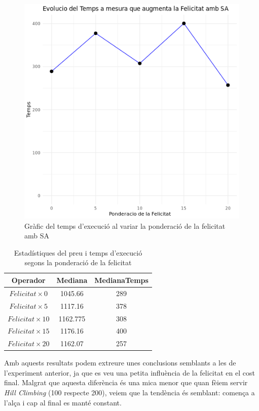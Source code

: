 \documentclass[a4paper]{article}
\begin{document}
\begin{table}[ht]
\begin{figure}[H]
\begin{minipage}{0.45\textwidth}
			\includegraphics[width=\textwidth]{images/exp7b_grafic.png}
			\caption{Gràfic del temps d'execució al variar la ponderació de la felicitat amb SA}
			\label{fig:exp7b_grafic}
		\end{minipage}
	\end{figure}
	
	\begin{table}[H]
		\centering
		\begin{tabular}{|c|c|c|}
			\hline
			\textbf{Operador} & \textbf{Mediana} & \textbf{MedianaTemps} \\
			\hline
			$Felicitat \times 0$ & 1045.66 & 289\\
			\hline
			$Felicitat \times 5$ & 1117.16 & 378\\
			\hline
			$Felicitat \times 10$ & 1162.775 & 308\\
			\hline
			$Felicitat \times 15$ & 1176.16 & 400\\
			\hline
			$Felicitat \times 20$ & 1162.07 & 257\\
			\hline
		\end{tabular}
		\caption{Estadístiques del preu i temps d'execució segons la ponderació de la felicitat}
		\label{tab:exp7_estadisticas}
	\end{table}
	
	Amb aquests resultats podem extreure unes conclusions semblants a les de l'experiment anterior, ja que es veu una petita influència de la felicitat en el cost final. Malgrat que aquesta diferència és una mica menor que quan fèiem servir \textit{Hill Climbing} (100 respecte 200), veiem que la tendència és semblant: comença a l'alça i cap al final es manté constant. \\
	

\end{table}
\end{document}

